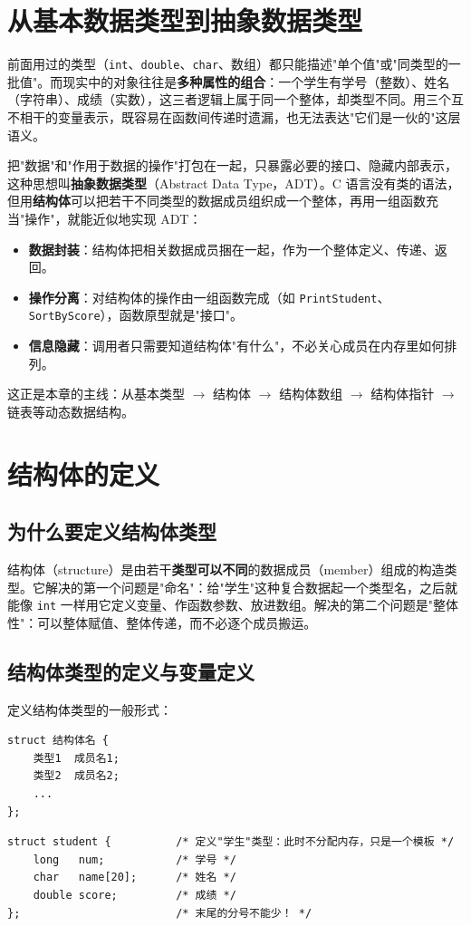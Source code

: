
\section{从基本数据类型到抽象数据类型}
前面用过的类型（\texttt{int}、\texttt{double}、\texttt{char}、数组）都只能描述"单个值"或"同类型的一批值"。而现实中的对象往往是\textbf{多种属性的组合}：一个学生有学号（整数）、姓名（字符串）、成绩（实数），这三者逻辑上属于同一个整体，却类型不同。用三个互不相干的变量表示，既容易在函数间传递时遗漏，也无法表达"它们是一伙的"这层语义。

把"数据"和"作用于数据的操作"打包在一起，只暴露必要的接口、隐藏内部表示，这种思想叫\textbf{抽象数据类型}（Abstract Data Type，ADT）。C 语言没有类的语法，但用\textbf{结构体}可以把若干不同类型的数据成员组织成一个整体，再用一组函数充当"操作"，就能近似地实现 ADT：

\begin{itemize}
  \item \textbf{数据封装}：结构体把相关数据成员捆在一起，作为一个整体定义、传递、返回。
  \item \textbf{操作分离}：对结构体的操作由一组函数完成（如 \texttt{PrintStudent}、\texttt{SortByScore}），函数原型就是"接口"。
  \item \textbf{信息隐藏}：调用者只需要知道结构体"有什么"，不必关心成员在内存里如何排列。
\end{itemize}

这正是本章的主线：从基本类型 $\to$ 结构体 $\to$ 结构体数组 $\to$ 结构体指针 $\to$ 链表等动态数据结构。

\section{结构体的定义}
\subsection{为什么要定义结构体类型}
结构体（structure）是由若干\textbf{类型可以不同}的数据成员（member）组成的构造类型。它解决的第一个问题是"命名"：给"学生"这种复合数据起一个类型名，之后就能像 \texttt{int} 一样用它定义变量、作函数参数、放进数组。解决的第二个问题是"整体性"：可以整体赋值、整体传递，而不必逐个成员搬运。

\subsection{结构体类型的定义与变量定义}
定义结构体类型的一般形式：
\begin{verbatim}
struct 结构体名 {
    类型1  成员名1;
    类型2  成员名2;
    ...
};
\end{verbatim}
\begin{lstlisting}
struct student {          /* 定义"学生"类型：此时不分配内存，只是一个模板 */
    long   num;           /* 学号 */
    char   name[20];      /* 姓名 */
    double score;         /* 成绩 */
};                        /* 末尾的分号不能少！ */
\end{lstlisting}

